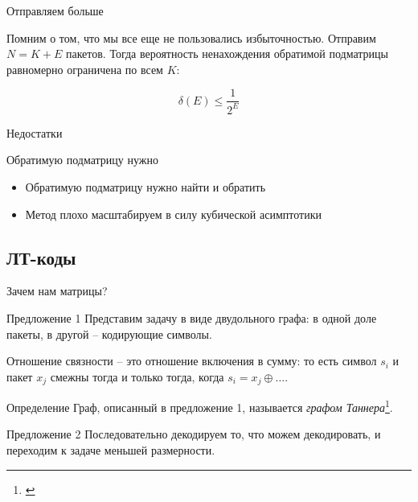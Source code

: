 \documentclass{beamer}
\begin{document}
\begin{frame}{Отправляем больше}

    Помним о том, что мы все еще не пользовались избыточностью. 
    Отправим $N=K+E$ пакетов. Тогда вероятность ненахождения
    обратимой подматрицы равномерно ограничена по всем $K$:

    \[
        \delta(E)\le\frac{1}{2^E}
    \]

    \begin{alertblock}{Недостатки}
    
        Обратимую подматрицу нужно
        
        \begin{itemize}
            \item Обратимую подматрицу нужно найти и обратить
            \item Метод плохо масштабируем в силу кубической
            асимптотики
        \end{itemize}
        
    \end{alertblock}

\end{frame}

\subsection{ЛТ-коды}

\begin{frame}{Зачем нам матрицы?}

    \begin{block}{Предложение 1}
        Представим задачу в виде двудольного графа: 
        в одной доле пакеты, в другой -- кодирующие символы.
        
        Отношение связности -- это отношение включения в сумму: то 
        есть символ $s_i$ и пакет $x_j$ смежны
        тогда и только тогда, когда $s_i = x_j\oplus\dots$.
    \end{block}

    \begin{block}{Определение}
        Граф, описанный в предложение 1, называется 
        \textit{графом Таннера}\footnote{\cite{Tanner1981Sep}}.
    \end{block}

    \begin{block}{Предложение 2}
        Последовательно декодируем то, что можем декодировать, и 
        переходим к задаче меньшей размерности.
    \end{block}
    
\end{frame}
\end{document}

